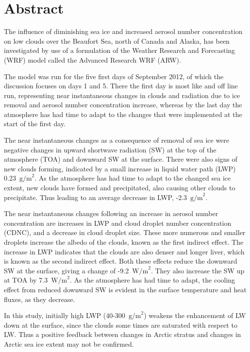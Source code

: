 \chapter*{Abstract}
The influence of diminishing sea ice and increased aerosol number concentration on low clouds over the Beaufort Sea, north of Canada and Alaska, has been investigated by use of a formulation of the Weather Research and Forecasting (WRF) model called the Advanced Research WRF (ARW).

The model was run for the five first days of September 2012, of which the discussion focuses on days 1 and 5. There the first day is most like and off line run, representing near instantaneous changes in clouds and radiation due to ice removal and aerosol number concentration increase, whereas by the last day the atmosphere has had time to adapt to the changes that were implemented at the start of the first day.

The near instantaneous changes as a consequence of removal of sea ice were negative changes in upward shortwave radiation (SW) at the top of the atmosphere (TOA) and downward SW at the surface. There were also signs of new clouds forming, indicated by a small increase in liquid water path (LWP) 0.23~$\text{g/m}^2$. As the atmosphere has had time to adapt to the changed sea ice extent, new clouds have formed and precipitated, also causing other clouds to precipitate. Thus leading to an average decrease in LWP, -2.3~$\text{g/m}^2$.

The near instantaneous changes following an increase in aerosol number concentration are increases in LWP and cloud droplet number concentration (CDNC), and a decrease in cloud droplet size. These more numerous and smaller droplets increase the albedo of the clouds, known as the first indirect effect. The increase in LWP indicates that the clouds are also denser and longer liver, which is known as the second indirect effect. Both these effects reduce the downward SW at the surface, giving a change of -9.2~$\text{W/m}^2$. They also increase the SW up at TOA by 7.3~$\text{W/m}^2$. As the atmosphere has had time to adapt, the cooling effect from reduced downward SW is evident in the surface temperature and heat fluxes, as they decrease.

In this study, initially high LWP (40-300~$\text{g/m}^2$) weakens the enhancement of LW down at the surface, since the clouds some times are saturated with respect to LW. Thus a positive feedback between changes in Arctic stratus and changes in Arctic sea ice extent may not be confirmed.